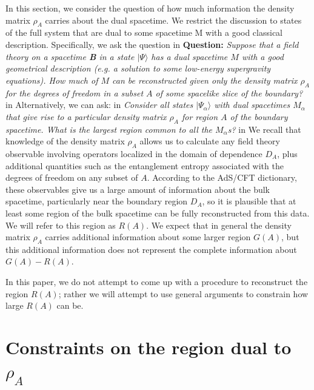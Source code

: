 \documentclass[12pt]{article}
\renewcommand{\(}{\left(}
\renewcommand{\)}{\right)}
\begin{document}
In this section, we consider the question of how much information the density matrix $\rho_A$ carries about the dual spacetime. We restrict the discussion to states of the full system that are dual to some spacetime M with a good classical description.
Specifically, we ask the question
 in
\noindent
{\bf Question:}  {\it Suppose that a field theory on a spacetime {\bf B} in a state $|\Psi \rangle$ has a dual spacetime $M$ with a good geometrical description (e.g. a solution to some low-energy supergravity equations). How much of $M$ can be reconstructed given only the density matrix $\rho_A$ for the degrees of freedom in a subset $A$ of some spacelike slice of the boundary?}
 in
\noindent
Alternatively, we can ask:
 in
\noindent
{\it Consider all states $|\Psi_\alpha \rangle$ with dual spacetimes $M_\alpha$ that give rise to a particular density matrix $\rho_A$ for region $A$ of the boundary spacetime. What is the largest region common to all the $M_\alpha$s? }
 in
\noindent
We recall that knowledge of the density matrix $\rho_A$ allows us to calculate any field theory observable involving operators localized in the domain of dependence $D_A$, plus additional quantities such as the entanglement entropy associated with the degrees of freedom on any subset of $A$. According to the AdS/CFT dictionary, these observables give us a large amount of information about the bulk spacetime, particularly near the boundary region $D_A$, so it is plausible that at least some region of the bulk spacetime can be fully reconstructed from this data. We will refer to this region as $R(A)$.  We expect that in general the density matrix $\rho_A$ carries additional information about some larger region $G(A)$, but this additional information does not represent the complete information about $G(A) - R(A)$.

In this paper, we do not attempt to come up with a procedure to reconstruct the region $R(A)$; rather we will attempt to use general arguments to constrain how large $R(A)$ can be.

\section{Constraints on the region dual to $\rho_A$}
\end{document}
